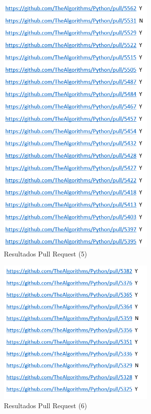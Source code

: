 \documentclass[a4paper, 12pt]{book}
\begin{document}
\begin{figure}
	\centering
    \includegraphics[width=0.7\textwidth]{img/git9}
    \caption{Resultados Pull Request (5)}
    \label{figura:git9}
 \end{figure}
 
\begin{figure}
	\centering
    \includegraphics[width=0.7\textwidth]{img/git10}
    \caption{Resultados Pull Request (6)}
    \label{figura:git10}
 \end{figure}
 
\end{document}
